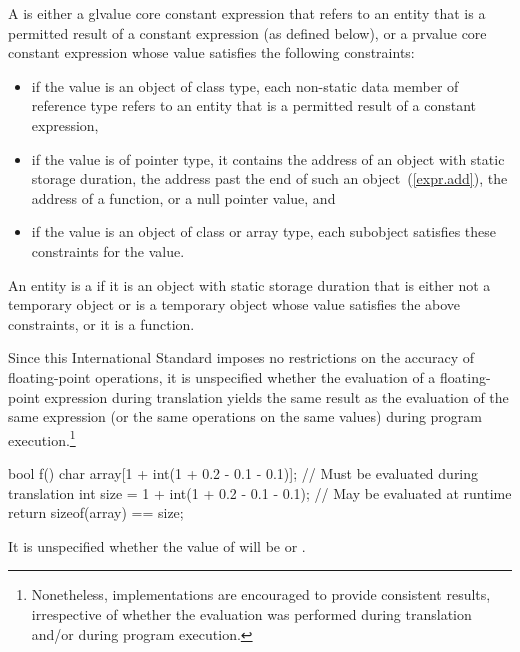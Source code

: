 \pnum
{}%
A  is either
a glvalue core constant expression that refers to
an entity that is a permitted result of a constant expression (as defined below), or
a prvalue core constant expression whose value
satisfies the following constraints:

\begin{itemize}
  \item
  if the value is an object of class type,
  each non-static data member of reference type refers to
  an entity that is a permitted result of a constant expression,

  \item
  if the value is of pointer type, it contains
  the address of an object with static storage duration,
  the address past the end of such an object~(\ref{expr.add}),
  the address of a function,
  or a null pointer value, and

  \item
  if the value is an object of class or array type,
  each subobject satisfies these constraints for the value.
\end{itemize}
An entity is a
if it is an
object with static storage duration that is either not a temporary object or is
a temporary object whose value satisfies the above constraints, or it is a
function.

\pnum
\begin{note} Since this International Standard
imposes no restrictions on the accuracy of floating-point operations, it is unspecified whether the
evaluation of a floating-point expression during translation yields the same result as the
evaluation of the same expression (or the same operations on the same values) during program
execution.\footnote{Nonetheless, implementations are encouraged to provide consistent results,
irrespective of whether the evaluation was performed during translation and/or during program
execution.} \begin{example}

\begin{codeblock}
bool f() {
    char array[1 + int(1 + 0.2 - 0.1 - 0.1)];  // Must be evaluated during translation
    int size = 1 + int(1 + 0.2 - 0.1 - 0.1);   // May be evaluated at runtime
    return sizeof(array) == size;
}
\end{codeblock}
It is unspecified whether the value of  will be  or .
\end{example} \end{note}

